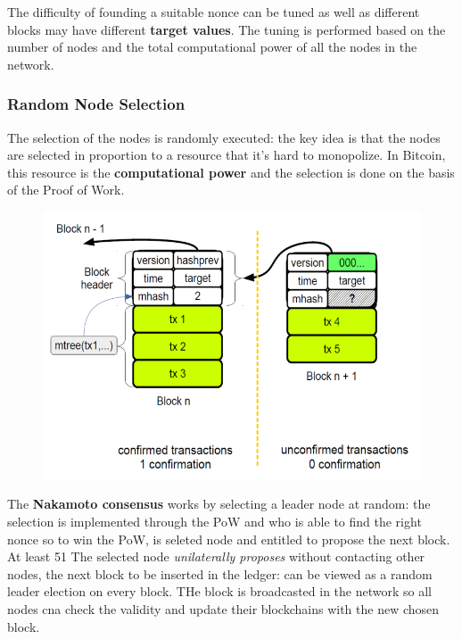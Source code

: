 \documentclass[10pt,a4paper]{report}
\begin{document}
The difficulty of founding a suitable nonce can be tuned as well as different blocks may have different \textbf{target values}. The tuning is performed based on the number of nodes and the total computational power of all the nodes in the network.
\subsubsection{Random Node Selection}\label{sec:random-node-selection}
The selection of the nodes is randomly executed: the key idea is that the nodes are selected in proportion to a resource that it's hard to monopolize. In Bitcoin, this resource is the \textbf{computational power} and the selection is done on the basis of the Proof of Work.
\begin{figure}[h]
	\centering
	\includegraphics[scale=0.40]{images/Pasted image 20230331152559.png}
	\end{figure}


The \textbf{Nakamoto consensus} works by selecting a leader node at random: the selection is implemented through the PoW and who is able to find the right nonce so to win the PoW, is seleted node and entitled to propose the next block. At least 51%
The selected node \textit{unilaterally proposes} without contacting other nodes, the next block to be inserted in the ledger: can be viewed as a random leader election on every block.
THe block is broadcasted in the network so all nodes cna check the validity and update their blockchains with the new chosen block.
\end{document}
